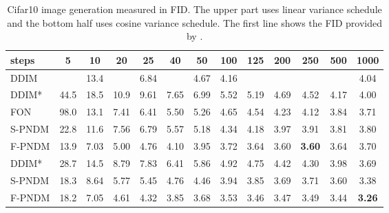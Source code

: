 \documentclass{article}
\begin{document}
\begin{table}[htbp]
   \begin{center}
      \begin{tabular}{l|c c c c c c c c c c c c}
         \toprule
         steps      & 5 & 10 & 20 & 25 & 40 & 50 & 100 & 125 & 200 & 250 & 500 & 1000 \\
         \midrule
         DDIM       &      & 13.4 &  & 6.84 &  & 4.67 & 4.16 & & & & & 4.04 \\
         DDIM*      & 44.5 & 18.5 & 10.9 & 9.61 & 7.65 & 6.99 & 5.52 & 5.19 & 4.69 & 4.52 & 4.17 & 4.00 \\
         FON         & 98.0 & 13.1 & 7.41 & 6.41 & 5.50 & 5.26 & 4.65 & 4.54 & 4.23 & 4.12 & 3.84 & 3.71 \\
         S-PNDM     & 22.8 & 11.6 & 7.56 & 6.79 & 5.57 & 5.18 & 4.34 & 4.18 & 3.97 & 3.91 & 3.81 & 3.80 \\
         F-PNDM     & 13.9 & 7.03 & 5.00 & 4.76 & 4.10 & 3.95 & 3.72 & 3.64 & 3.60 & \textbf{3.60} & 3.64 & 3.70 \\
         \midrule
         DDIM*      & 28.7 & 14.5 & 8.79 & 7.83 & 6.41 & 5.86 & 4.92 & 4.75 & 4.42 & 4.30 & 3.98 & 3.69 \\
         S-PNDM     & 18.3 & 8.64 & 5.77 & 5.45 & 4.76 & 4.46 & 3.94 & 3.85 & 3.69 & 3.71 & 3.60 & 3.38 \\
         F-PNDM     & 18.2 & 7.05 & 4.61 & 4.32 & 3.85 & 3.68 & 3.53 & 3.46 & 3.47 & 3.49 & 3.44 & \textbf{3.26} \\
         \bottomrule
      \end{tabular}
   \end{center}
   \caption{Cifar10 image generation measured in FID. The upper part uses linear variance schedule and the bottom half uses cosine variance schedule. The first line shows the FID provided by \citet{Song2020a}.}
   \label{tb_cifar_f}
\end{table}
\end{document}
